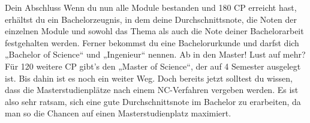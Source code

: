 Dein Abschluss
Wenn du nun alle Module bestanden und 180 CP erreicht hast, erhältst du ein Bachelorzeugnis, in dem deine Durchschnittsnote, die Noten der einzelnen Module und sowohl das Thema als auch die Note deiner Bachelorarbeit festgehalten werden. Ferner bekommst du eine Bachelorurkunde und darfst dich „Bachelor of Science“ und „Ingenieur“ nennen.
Ab in den Master!
Lust auf mehr? Für 120 weitere CP gibt's den „Master of Science“, der auf 4 Semester ausgelegt ist. Bis dahin ist es noch ein weiter Weg. Doch bereits jetzt solltest du wissen, dass die Masterstudienplätze nach einem NC-Verfahren vergeben werden. Es ist also sehr ratsam, sich eine gute Durchschnittsnote im Bachelor zu erarbeiten, da man so die Chancen auf einen Masterstudienplatz maximiert.